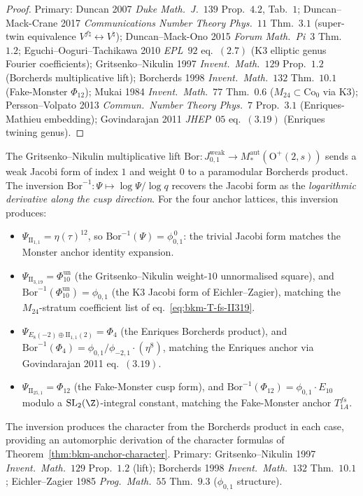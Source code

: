 \begin{proof}
Primary: Duncan 2007 \emph{Duke Math.~J.}~$139$ Prop.~$4.2$, Tab.~$1$;
Duncan--Mack-Crane 2017 \emph{Communications Number Theory Phys.}~$11$
Thm.~$3.1$ (super-twin equivalence $V^{f\natural}\leftrightarrow V^\natural$);
Duncan--Mack-Ono 2015 \emph{Forum Math.~Pi}~$3$ Thm.~$1.2$;
Eguchi--Ooguri--Tachikawa 2010 \emph{EPL}~$92$ eq.~$(2.7)$ (K3 elliptic
genus Fourier coefficients);
Gritsenko--Nikulin 1997 \emph{Invent.~Math.}~$129$ Prop.~$1.2$
(Borcherds multiplicative lift);
Borcherds 1998 \emph{Invent.~Math.}~$132$ Thm.~$10.1$ (Fake-Monster
$\Phi_{12}$);
Mukai 1984 \emph{Invent.~Math.}~$77$ Thm.~$0.6$
($M_{24}\subset\mathrm{Co}_0$ via K3);
Persson--Volpato 2013 \emph{Commun.~Number Theory Phys.}~$7$ Prop.~$3.1$
(Enriques-Mathieu embedding);
Govindarajan 2011 \emph{JHEP}~$05$ eq.~$(3.19)$
(Enriques twining genus).
\end{proof}

\begin{remark}
\label{rem:bkm-gn-inverted-character}
The Gritsenko--Nikulin multiplicative lift
$\mathrm{Bor}\colon J^{\mathrm{weak}}_{0,1}\to M^{\mathrm{aut}}_*(\mathrm{O}^+(2,s))$
sends a weak Jacobi form of index $1$ and weight $0$ to a paramodular
Borcherds product. The inversion
$\mathrm{Bor}^{-1}\colon \Psi \mapsto \log\Psi / \log q$ recovers the
Jacobi form as the \emph{logarithmic derivative along the cusp
direction}. For the four anchor lattices, this inversion produces:
\begin{itemize}
\item $\Psi_{\mathrm{II}_{1,1}} = \eta(\tau)^{12}$, so
$\mathrm{Bor}^{-1}(\Psi) = \phi_{0,1}^{\,0}$: the trivial Jacobi form
matches the Monster anchor identity expansion.
\item \(\Psi_{\mathrm{II}_{3,19}} = \Phi_{10}^{\mathrm{un}}\) (the Gritsenko--Nikulin
weight-$10$ unnormalised square), and \(\mathrm{Bor}^{-1}(\Phi_{10}^{\mathrm{un}}) = \phi_{0,1}\)
(the K3 Jacobi form of Eichler--Zagier), matching the $M_{24}$-stratum
coefficient list of eq.~\eqref{eq:bkm-T-fs-II319}.
\item $\Psi_{E_8(-2)\oplus\mathrm{II}_{1,1}(2)} = \Phi_4$ (the
Enriques Borcherds product), and
$\mathrm{Bor}^{-1}(\Phi_4) = \phi_{0,1}/\phi_{-2,1}\cdot (\eta^8)$,
matching the Enriques anchor via Govindarajan 2011 eq.~$(3.19)$.
\item $\Psi_{\mathrm{II}_{25,1}} = \Phi_{12}$ (the Fake-Monster cusp
form), and $\mathrm{Bor}^{-1}(\Phi_{12}) = \phi_{0,1}\cdot E_{10}$
modulo a $\mathrm{SL}_2(\Z)$-integral constant, matching the
Fake-Monster anchor $T^{fs}_{1A}$.
\end{itemize}
The inversion produces the character from the Borcherds product in
each case, providing an automorphic derivation of the character
formulas of Theorem~\ref{thm:bkm-anchor-character}.
Primary:
Gritsenko--Nikulin 1997 \emph{Invent.~Math.}~$129$ Prop.~$1.2$ (lift);
Borcherds 1998 \emph{Invent.~Math.}~$132$ Thm.~$10.1$;
Eichler--Zagier 1985 \emph{Prog.~Math.}~$55$ Thm.~$9.3$
($\phi_{0,1}$ structure).
\end{remark}

